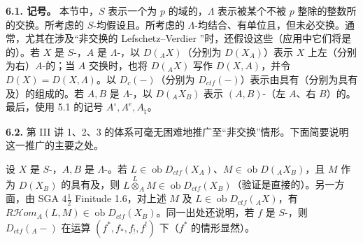 \textbf{6.1. 记号。} 本节中，$S$ 表示一个为 $p$ 的域的，$\Lambda$ 表示被某个不被 $p$ 整除的整数所的交换。所考虑的 $S$-均假设且。所考虑的 $\Lambda$-均结合、有单位且，但未必交换。通常，尤其在涉及“非交换的 Lefschetz--Verdier ”时，还假设这些（应用中它们将是的）。若 $X$ 是 $S$-，$A$ 是 $\Lambda$-，以 $D({}_AX)$（分别为 $D(X_A)$）表示 $X$ 上左（分别为右）$A$-的；当 $A$ 交换时，也将 $D({}_AX)$ 写作 $D(X,A)$，并令 $D(X)=D(X,\Lambda)$。以 $D_c(-)$（分别为 $D_{ctf}(-)$）表示由具有（分别为具有及）的组成的。若 $A,B$ 是 $\Lambda$-，以 $D({}_AX_B)$ 表示 $(A,B)$-（左 $A$、右 $B$）的。最后，使用 5.1 的记号 $A^\circ,A^e,A_\natural$。

\textbf{6.2.} 第 III 讲 1、2、3 的体系可毫无困难地推广至“非交换”情形。下面简要说明这一推广的主要之处。

设 $X$ 是 $S$-，$A,B$ 是 $\Lambda$-。若 $L\in\operatorname{ob}D_{ctf}(X_A)$、$M\in\operatorname{ob}D({}_AX_B)$，且 $M$ 作为 $D(X_B)$ 的具有及，则 $L\overset L\otimes_A M\in\operatorname{ob}D_{ctf}(X_B)$（验证是直接的）。另一方面，由 SGA $4\frac12$ Finitude 1.6，对上述 $M$ 及 $L\in\operatorname{ob}D_{ctf}({}_AX)$，有 $R\mathcal H\!om_A(L,M)\in\operatorname{ob}D_{ctf}(X_B)$。同一出处还说明，若 $f$ 是 $S$-，则 $D_{ctf}({}_A-)$ 在运算 $(f^*,f_*,f_!,f^!)$ 下（$f^*$ 的情形显然）。

